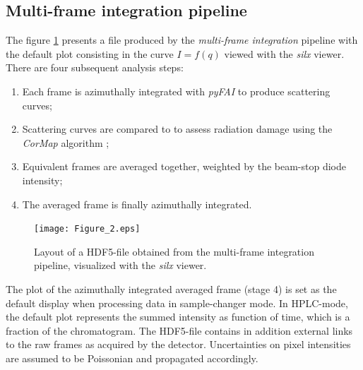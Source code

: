 \documentclass[preprint]{iucr}              %
\begin{document}
\subsection{Multi-frame integration pipeline}
\label{multiframe_pipeline}
The figure \ref{multiframe} presents a file produced by the \textit{multi-frame integration} pipeline with the default plot consisting in the curve $I = f(q)$ viewed with the \textit{silx} viewer. 
There are four subsequent analysis steps:
\begin{enumerate}
\item Each frame is azimuthally integrated with \textit{pyFAI} \cite{pyfai_2020} to produce scattering curves;
\item Scattering curves are compared to to assess radiation damage using the \textit{CorMap} algorithm \cite{CorMap};
\item Equivalent frames are averaged together, weighted by the beam-stop diode intensity; 
\item The averaged frame is finally azimuthally integrated. 
\end{enumerate}

\begin{figure}
\caption{Layout of a HDF5-file obtained from the multi-frame integration pipeline, visualized with the \textit{silx} viewer.}
\texttt{[image: Figure\_2.eps]}
\label{multiframe}
\end{figure}


The plot of the azimuthally integrated averaged frame (stage 4) is set as the default display  when processing data in sample-changer mode.
In HPLC-mode, the default plot represents the summed intensity as function of time, which is a fraction of the chromatogram. 
The HDF5-file contains in addition external links to the raw frames as acquired by the detector.
Uncertainties on pixel intensities are assumed to be Poissonian and propagated accordingly.
\end{document}
